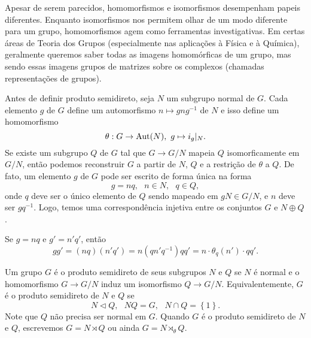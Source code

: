 	Apesar de serem parecidos, homomorfismos e isomorfismos desempenham papeis diferentes.
	Enquanto isomorfismos nos permitem olhar de um modo diferente para um grupo, homomorfismos agem como
	ferramentas investigativas. Em certas áreas de Teoria dos Grupos (especialmente nas aplicações
	à Física e à Química),
	geralmente queremos saber todas as imagens homomórficas de um grupo, mas sendo essas imagens grupos de
	matrizes sobre os complexos (chamadas representações de grupos). 
	
	\par\vspace{0.3cm} Antes de definir produto semidireto, seja $N$ um subgrupo normal de $G$. 
	Cada elemento $g$ de $G$ define um automorfismo $n\mapsto gng^{-1}$ de $N$ e isso define um homomorfismo
	\begin{equation*}
	    \theta: G\to \operatorname{Aut}(N), \text{ }g\mapsto i_g|_N.
	\end{equation*}
	Se existe um subgrupo $Q$ de $G$ tal que $G\to G/N$ mapeia $Q$ isomorficamente 
	em $G/N$, então podemos reconstruir $G$ a partir de $N$, $Q$ e a restrição de $\theta$ a $Q$. 
	De fato, um elemento $g$ de $G$ pode ser escrito de forma única na forma
	\begin{equation*}
	    g=nq, \text{ }n\in N, \text{ }q\in Q,
	\end{equation*}
	onde $q$ deve ser o único elemento de $Q$ sendo mapeado em $gN\in G/N$, e 
	$n$ deve ser $gq^{-1}$. Logo, temos uma correspondência injetiva entre os conjuntos
	$G$ e $N\oplus Q$.
	\par\vspace{0.3cm} Se $g=nq$ e $g'=n'q'$, então
	\begin{equation*}
	    gg' = (nq)(n'q') = n(qn'q^{-1})qq' = n\cdot\theta_q(n')\cdot qq'.
	\end{equation*}
	\begin{definition}
	\label{produto semidireto}
		Um grupo $G$ é o produto semidireto de seus subgrupos $N$ e $Q$ se $N$ é normal e 
		o homomorfismo $G\to G/N$ induz um isomorfismo $Q\to G/N$. Equivalentemente, 
		$G$ é o produto semidireto de $N$ e $Q$ se
		\begin{equation*}
		    N\vartriangleleft Q, \text{ }NQ = G,\text{ }N\cap Q=\left\{1\right\}.
		\end{equation*}
		Note que $Q$ não precisa ser normal em $G$. Quando $G$ é o produto semidireto 
	de $N$ e $Q$, escrevemos $G = N \rtimes Q$ ou ainda $G = N\rtimes_{\theta} Q$.
	\end{definition}
